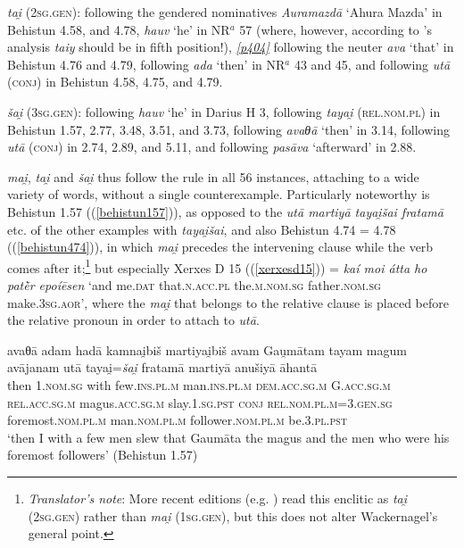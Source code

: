 \emph{tai̯} (\textsc{2sg.gen}): following the gendered nominatives \emph{Auramazdā} `Ahura Mazda' in Behistun 4.58, and 4.78, \emph{hauv} `he' in NR$^a$ 57 (where, however, according to \citeauthor{Thumb1887}'s analysis \emph{taiy} should be in fifth position!), \hyperlink{p404}{\emph{[p404]}} following the neuter \emph{ava} `that' in Behistun 4.76 and 4.79, following \emph{ada} `then' in NR$^a$ 43 and 45, and following \emph{utā} (\textsc{conj}) in Behistun 4.58, 4.75, and 4.79.

\emph{šai̯} (\textsc{3sg.gen}): following \emph{hauv} `he' in Darius H 3, following \emph{tayai̯} (\textsc{rel.nom.pl}) in Behistun 1.57, 2.77, 3.48, 3.51, and 3.73, following \emph{avaθā} `then' in 3.14, following \emph{utā} (\textsc{conj}) in 2.74, 2.89, and 5.11, and following \emph{pasāva} `afterward' in 2.88.

\emph{mai̯}, \emph{tai̯} and \emph{šai̯} thus follow the rule in all 56 instances, attaching to a wide variety of words, without a single counterexample. Particularly noteworthy is Behistun 1.57 ((\ref{behistun157})), as opposed to the \emph{utā martiyā tayai̯\emph{šai} fratamā} etc. of the other examples with \emph{tayai̯šai}, and also Behistun 4.74 = 4.78 ((\ref{behistun474})), in which \emph{mai̯} precedes the intervening clause while the verb comes after it;\footnote{\emph{Translator's note}: More recent editions (e.g. \citealp{Kent1953,Schmitt1991}) read this enclitic as \textit{tai̯} (\textsc{2sg.gen}) rather than \textit{mai̯} (\textsc{1sg.gen}), but this does not alter Wackernagel's general point.} but especially Xerxes D 15 ((\ref{xerxesd15})) = \textit{kaí \emph{moi} átta ho patḕr epoíēsen} `and me.\textsc{dat} that.\textsc{n.acc.pl} the.\textsc{m.nom.sg} father.\textsc{nom.sg} make.\textsc{3sg.aor}', where the \emph{mai̯} that belongs to the relative clause is placed before the relative pronoun in order to attach to \emph{utā}.

\begin{exe}
\ex
\gll avaθā adam hadā kamnai̯biš martiyai̯biš avam Gau̯mātam tayam magum avājanam utā tayai̯=\emph{šai̯} fratamā martiyā anušiyā āhantā\\
then \textsc{1.nom.sg} with few.\textsc{ins.pl.m} man.\textsc{ins.pl.m} \textsc{dem.acc.sg.m} G.\textsc{acc.sg.m} \textsc{rel.acc.sg.m} magus.\textsc{acc.sg.m} slay.\textsc{1.sg.pst} \textsc{conj} \textsc{rel.nom.pl.m}=\textsc{3.gen.sg} foremost.\textsc{nom.pl.m} man.\textsc{nom.pl.m} follower.\textsc{nom.pl.m} be.\textsc{3.pl.pst}\\
\trans `then I with a few men slew that Gaumāta the magus and the men who were his foremost followers' (Behistun 1.57)
\label{behistun157}%
\end{exe}

